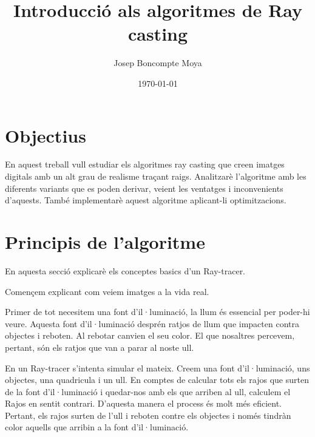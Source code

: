 \documentclass{article}
\title{Introducció als algoritmes de Ray casting}
\author{Josep Boncompte Moya}
\date{\today}
\begin{document}
\maketitle

\section{Objectius}
En aquest treball vull estudiar els algoritmes ray casting que creen imatges digitals amb un alt grau de realisme traçant raigs.
Analitzarè l'algoritme amb les diferents variants que es poden derivar, veient les ventatges i inconvenients d'aquests. 
També implementarè aquest algoritme aplicant-li optimitzacions.

\section{Principis de l'algoritme}
En aquesta secció explicarè els conceptes basics d'un Ray-tracer.

Començem explicant com veiem imatges a la vida real. 

Primer de tot necesitem una font d'il·luminació, la llum és essencial per
poder-hi veure. Aquesta font d'il·luminació desprén ratjos de llum que impacten contra objectes i reboten. Al rebotar canvien el
seu color. El que nosaltres percevem, pertant, són els ratjos que van a parar al noste ull.

En un Ray-tracer s'intenta simular el mateix. Creem una font d'il·luminació, uns objectes, una quadricula i un ull. 
En comptes de calcular tots els rajos que surten de la font d'il·luminació i quedar-nos amb els
que arriben al ull, calculem el Rajos en sentit contrari. D'aquesta manera el process és molt més eficient.
Pertant, els rajos surten de l'ull i reboten contre els objectes i només tindràn color aquells que arribin a la font
d'il·luminació.
\end{document}
